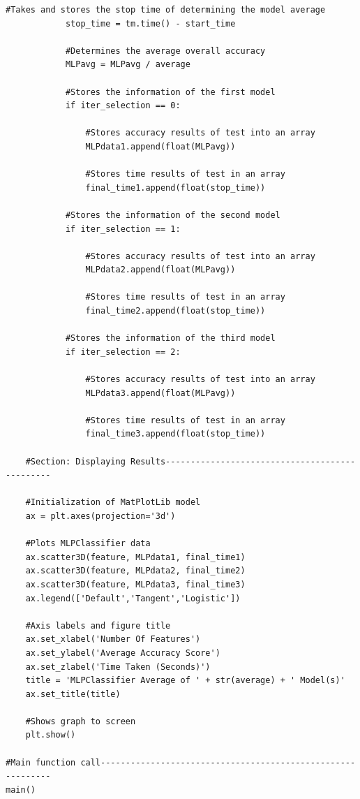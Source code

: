 \documentclass[a4paper, 12pt]{article}
\begin{document}
\begin{lstlisting}[frame = single]
            #Takes and stores the stop time of determining the model average
            stop_time = tm.time() - start_time
            
            #Determines the average overall accuracy
            MLPavg = MLPavg / average

            #Stores the information of the first model
            if iter_selection == 0:   
                
                #Stores accuracy results of test into an array
                MLPdata1.append(float(MLPavg))

                #Stores time results of test in an array
                final_time1.append(float(stop_time))

            #Stores the information of the second model
            if iter_selection == 1:

                #Stores accuracy results of test into an array
                MLPdata2.append(float(MLPavg))

                #Stores time results of test in an array
                final_time2.append(float(stop_time))

            #Stores the information of the third model
            if iter_selection == 2:

                #Stores accuracy results of test into an array
                MLPdata3.append(float(MLPavg))

                #Stores time results of test in an array
                final_time3.append(float(stop_time))

    #Section: Displaying Results-----------------------------------------------

    #Initialization of MatPlotLib model
    ax = plt.axes(projection='3d')

    #Plots MLPClassifier data
    ax.scatter3D(feature, MLPdata1, final_time1)
    ax.scatter3D(feature, MLPdata2, final_time2)
    ax.scatter3D(feature, MLPdata3, final_time3)
    ax.legend(['Default','Tangent','Logistic'])

    #Axis labels and figure title
    ax.set_xlabel('Number Of Features')
    ax.set_ylabel('Average Accuracy Score')
    ax.set_zlabel('Time Taken (Seconds)')
    title = 'MLPClassifier Average of ' + str(average) + ' Model(s)'
    ax.set_title(title)

    #Shows graph to screen
    plt.show()
    
#Main function call------------------------------------------------------------
main()
\end{lstlisting}
\end{document}
